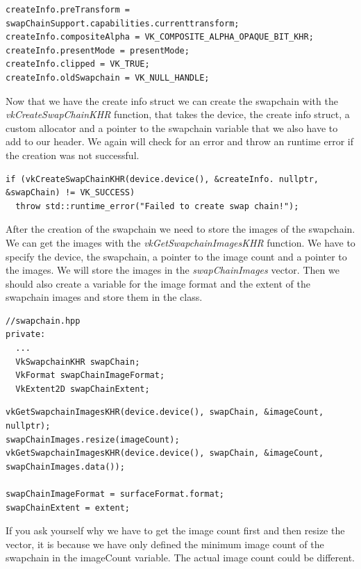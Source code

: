 \documentclass[12pt]{report} \usepackage{preamble}
\begin{document}
\begin{lstlisting}[Language=C++]
createInfo.preTransform = swapChainSupport.capabilities.currenttransform;
createInfo.compositeAlpha = VK_COMPOSITE_ALPHA_OPAQUE_BIT_KHR;
createInfo.presentMode = presentMode;
createInfo.clipped = VK_TRUE;
createInfo.oldSwapchain = VK_NULL_HANDLE;
\end{lstlisting}

Now that we have the create info struct we can create the swapchain with the \textit{vkCreateSwapChainKHR}
function, that takes the device, the create info struct, a custom allocator and a pointer to the swapchain
variable that we also have to add to our header. We again will check for an error and throw an runtime
error if the creation was not successful.

\begin{lstlisting}[Language=C++]
if (vkCreateSwapChainKHR(device.device(), &createInfo. nullptr, &swapChain) != VK_SUCCESS)
  throw std::runtime_error("Failed to create swap chain!");
\end{lstlisting}

After the creation of the swapchain we need to store the images of the swapchain. We can get the images
with the \textit{vkGetSwapchainImagesKHR} function. We have to specify the device, the swapchain, a pointer
to the image count and a pointer to the images. We will store the images in the \textit{swapChainImages}
vector. Then we should also create a variable for the image format and the extent of the swapchain images
and store them in the class.

\begin{lstlisting}[Language=C++]
//swapchain.hpp
private:
  ...
  VkSwapchainKHR swapChain;
  VkFormat swapChainImageFormat;
  VkExtent2D swapChainExtent;
\end{lstlisting}

\begin{lstlisting}[Language=C++]
vkGetSwapchainImagesKHR(device.device(), swapChain, &imageCount, nullptr);
swapChainImages.resize(imageCount);
vkGetSwapchainImagesKHR(device.device(), swapChain, &imageCount, swapChainImages.data());

swapChainImageFormat = surfaceFormat.format;
swapChainExtent = extent;
\end{lstlisting}

If you ask yourself why we have to get the image count first and then resize the vector, it is because
we have only defined the minimum image count of the swapchain in the imageCount variable. The actual
image count could be different.
\end{document}
